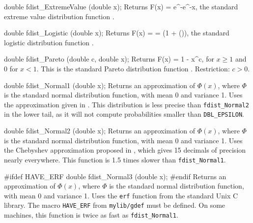 double fdist_ExtremeValue (double x);
\endcode
 \tab
  Returns 
 \eq
     F(x) = e^{-e^{-x}},                       
 \endeq
  the standard extreme value distribution function \cite{tJOH95b}.
 \endtab
\code


double fdist_Logistic (double x);
\endcode
 \tab
  Returns 
  \eq F(x) =  =
       \left(1 + \tanh \left(\right)\right),
  \endeq
  the standard logistic distribution function \cite{tJOH95b}.
 \endtab
\code


double fdist_Pareto (double c, double x);
\endcode
  \tab
  Returns
  \eq
     F(x) = 1 -  {x^c},
  \endeq
  for $x\ge 1$ and 0 for $x<1$.  This is
  the standard Pareto distribution function \cite{tJOH95a}.
  Restriction: $c > 0$.
 \endtab
\code


double fdist_Normal1 (double x);
\endcode
  \tab  
  Returns an approximation of $\Phi(x)$, where $\Phi$ is the standard normal
  distribution function, with mean 0 and variance 1. 
  Uses the approximation given in \cite[page 90]{tKEN80a}. This distribution
  is less precise than {\tt fdist\_Normal2} in the lower tail, as it will
  not compute probabilities smaller than {\tt DBL\_EPSILON}.
 \endtab
\code


double fdist_Normal2 (double x);
\endcode
  \tab  
  Returns an approximation of $\Phi(x)$, 
  where $\Phi$ is the standard normal distribution function,
  with mean 0 and variance 1. 
  Uses the Chebyshev approximation proposed in \cite{tSCH78a},
  which gives 15 decimals of precision nearly everywhere.
  This function is 1.5 times slower than {\tt fdist\_Normal1}.
 \endtab
\code


#ifdef HAVE_ERF
   double fdist_Normal3 (double x);
#endif
\endcode
  \tab
  Returns an approximation of $\Phi(x)$, 
  where $\Phi$ is the standard normal distribution function,
  with mean 0 and variance 1. 
  Uses the {\tt erf} function from the standard Unix C library. The macro
  {\tt HAVE\_ERF} from {\tt mylib/gdef} must be defined. On some machines,
   this function is twice as fast as {\tt fdist\_Normal1}.
 \endtab
\code



